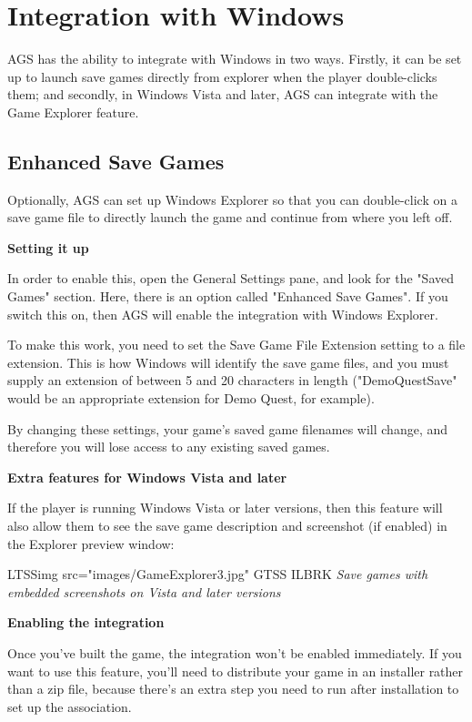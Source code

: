 \section{Integration with Windows}%

AGS has the ability to integrate with Windows in two ways. Firstly, it can
be set up to launch save games directly from explorer when the player double-clicks
them; and secondly, in Windows Vista and later, AGS can integrate with the Game Explorer feature.


\subsection{Enhanced Save Games}\label{EnhancedSaveGames}%

Optionally, AGS can set up Windows Explorer so that you can double-click on a save game
file to directly launch the game and continue from where you left off.

\bf{Setting it up}

In order to enable this, open the General Settings pane, and look for the "Saved Games"
section. Here, there is an option called "Enhanced Save Games". If you switch this on,
then AGS will enable the integration with Windows Explorer.

To make this work, you need to set the Save Game File Extension setting to a file extension.
This is how Windows will identify the save game files, and you must supply an extension
of between 5 and 20 characters in length ("DemoQuestSave" would be an appropriate
extension for Demo Quest, for example).

By changing these settings, your game's saved game filenames will change, and therefore
you will lose access to any existing saved games.

\bf{Extra features for Windows Vista and later}

If the player is running Windows Vista or later versions, then this feature will also allow them to see
the save game description and screenshot (if enabled) in the Explorer preview window:

LTSSimg src="images/GameExplorer3.jpg" GTSS ILBRK
\it{Save games with embedded screenshots on Vista and later versions}

\bf{Enabling the integration}

Once you've built the game, the integration won't be enabled immediately. If you want to
use this feature, you'll need to distribute your game in an installer rather than a zip
file, because there's an extra step you need to run after installation to set up the
association.

